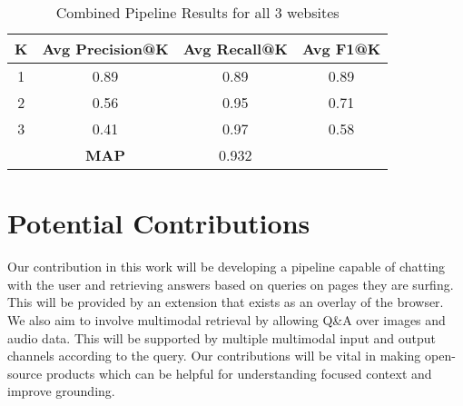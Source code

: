\documentclass[sigconf,natbib=true,anonymous=false]{acmart}
\begin{document}
\begin{table}[h]
\centering
\begin{tabular}{cccc}
\hline
\textbf{K} & \textbf{Avg Precision@K} & \textbf{Avg Recall@K} & \textbf{ Avg F1@K} \\ \hline
1          & 0.89                 & 0.89              & 0.89          \\
2          & 0.56                  & 0.95                 & 0.71          \\
3          & 0.41                 & 0.97                 & 0.58         \\ 
\hline
&\textbf{MAP}        &0.932& \\
\hline
\end{tabular}
\caption{Combined Pipeline Results for all 3 websites}
\label{tab:metrics_combined}
\end{table}

\section{Potential Contributions}
Our contribution in this work will be developing a pipeline capable of chatting with the user and retrieving answers based on queries on pages they are surfing. This will be provided by an extension that exists as an overlay of the browser. We also aim to involve multimodal retrieval by allowing Q\&A over images and audio data. This will be supported by multiple multimodal input and output channels according to the query. Our contributions will be vital in making open-source products which can be helpful for understanding focused context and improve grounding.


\appendix
\end{document}
